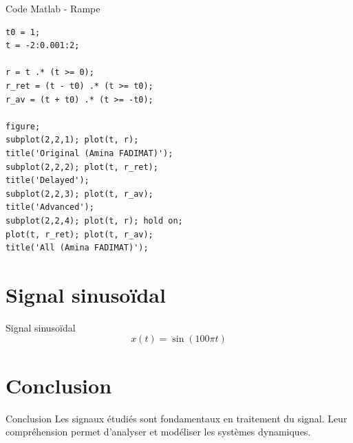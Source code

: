 \documentclass[10pt]{beamer}
\begin{document}
\begin{frame}[fragile]{Code Matlab - Rampe}
\begin{lstlisting}
t0 = 1;
t = -2:0.001:2;

r = t .* (t >= 0);
r_ret = (t - t0) .* (t >= t0);
r_av = (t + t0) .* (t >= -t0);

figure;
subplot(2,2,1); plot(t, r);
title('Original (Amina FADIMAT)');
subplot(2,2,2); plot(t, r_ret);
title('Delayed');
subplot(2,2,3); plot(t, r_av);
title('Advanced');
subplot(2,2,4); plot(t, r); hold on;
plot(t, r_ret); plot(t, r_av);
title('All (Amina FADIMAT)');
\end{lstlisting}
\end{frame}

\section{Signal sinusoïdal}
\begin{frame}{Signal sinusoïdal}
$$x(t)=\sin(100\pi t)$$
\end{frame}

\section{Conclusion}
\begin{frame}{Conclusion}
Les signaux étudiés sont fondamentaux en traitement du signal. Leur compréhension permet d'analyser et modéliser les systèmes dynamiques.
\end{frame}
\end{document}
